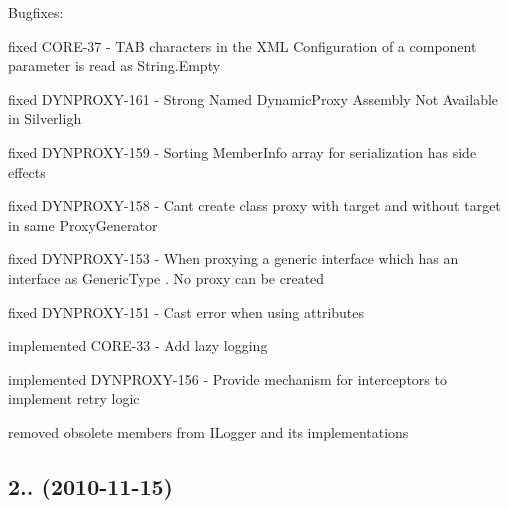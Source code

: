 Bugfixes\+:
\begin{DoxyItemize}
\item fixed C\+O\+R\+E-\/37 -\/ T\+AB characters in the X\+ML Configuration of a component parameter is read as String.\+Empty
\item fixed D\+Y\+N\+P\+R\+O\+X\+Y-\/161 -\/ Strong Named Dynamic\+Proxy Assembly Not Available in Silverligh
\item fixed D\+Y\+N\+P\+R\+O\+X\+Y-\/159 -\/ Sorting Member\+Info array for serialization has side effects
\item fixed D\+Y\+N\+P\+R\+O\+X\+Y-\/158 -\/ Can\textquotesingle{}t create class proxy with target and without target in same Proxy\+Generator
\item fixed D\+Y\+N\+P\+R\+O\+X\+Y-\/153 -\/ When proxying a generic interface which has an interface as Generic\+Type . No proxy can be created
\item fixed D\+Y\+N\+P\+R\+O\+X\+Y-\/151 -\/ Cast error when using attributes
\item implemented C\+O\+R\+E-\/33 -\/ Add lazy logging
\item implemented D\+Y\+N\+P\+R\+O\+X\+Y-\/156 -\/ Provide mechanism for interceptors to implement retry logic
\item removed obsolete members from I\+Logger and its implementations
\end{DoxyItemize}

\subsection*{2.. (2010-\/11-\/15)}


